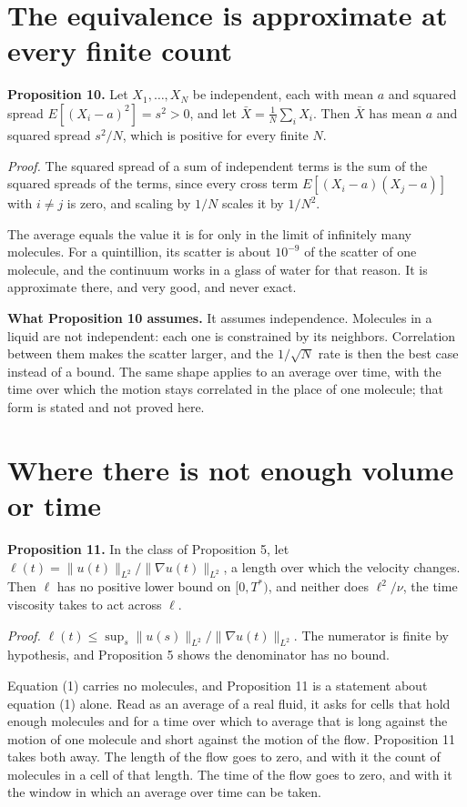 \section{The equivalence is approximate at every finite count}

\textbf{Proposition 10.} Let $X_1,\dots,X_N$ be independent, each with mean $a$ and squared spread
$E[(X_i-a)^2] = s^2 > 0$, and let $\bar X = \tfrac1N\sum_i X_i$. Then $\bar X$ has mean $a$ and
squared spread $s^2/N$, which is positive for every finite $N$.

\emph{Proof.} The squared spread of a sum of independent terms is the sum of the squared spreads of the terms, since every
cross term $E[(X_i-a)(X_j-a)]$ with $i\neq j$ is zero, and scaling by $1/N$ scales it by $1/N^2$.
\hfill\qedsymbol

The average equals the value it is for only in the limit of infinitely many molecules. For a
quintillion, its scatter is about $10^{-9}$ of the scatter of one molecule, and the continuum
works in a glass of water for that reason. It is approximate there, and very good, and never
exact.

\textbf{What Proposition 10 assumes.} It assumes independence. Molecules in a liquid are not
independent: each one is constrained by its neighbors. Correlation between them makes the scatter larger,
and the $1/\sqrt N$ rate is then the best case instead of a bound. The same shape applies to an average
over time, with the time over which the motion stays correlated in the place of one molecule; that
form is stated and not proved here.

\section{Where there is not enough volume or time}

\textbf{Proposition 11.} In the class of Proposition 5, let
$\ell(t) = \|u(t)\|_{L^2}/\|\nabla u(t)\|_{L^2}$, a length over which the velocity changes. Then
$\ell$ has no positive lower bound on $[0,T^*)$, and neither does $\ell^2/\nu$, the time viscosity
takes to act across $\ell$.

\emph{Proof.} $\ell(t) \le \sup_s\|u(s)\|_{L^2}/\|\nabla u(t)\|_{L^2}$. The numerator is finite by
hypothesis, and Proposition 5 shows the denominator has no bound. \hfill\qedsymbol

Equation (1) carries no molecules, and Proposition 11 is a statement about equation (1) alone.
Read as an average of a real fluid, it asks for cells that hold enough molecules and for a time
over which to average that is long against the motion of one molecule and short against the motion
of the flow. Proposition 11 takes both away. The length of the flow goes to zero, and with it the
count of molecules in a cell of that length. The time of the flow goes to zero, and with it the
window in which an average over time can be taken.

